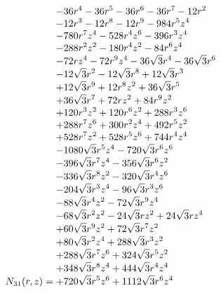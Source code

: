 \documentclass[11pt,a4paper]{article}
\begin{document}
\begin{equation}
N_{31}(r,z)=\shortstack[l]{$\displaystyle  - 36 r^{4} - 36 r^{5} - 36 r^{6} - 36 r^{7} - 12 r^{2}$\\
$\displaystyle  - 12 r^{3} - 12 r^{8} - 12 r^{9} - 984 r^{5} z^{4}$\\
$\displaystyle  - 780 r^{7} z^{4} - 528 r^{4} z^{6} - 396 r^{3} z^{4}$\\
$\displaystyle  - 288 r^{2} z^{2} - 180 r^{4} z^{2} - 84 r^{6} z^{4}$\\
$\displaystyle  - 72 r z^{4} - 72 r^{9} z^{4} - 36 \sqrt{3} r^{4} - 36 \sqrt{3} r^{6}$\\
$\displaystyle  - 12 \sqrt{3} r^{2} - 12 \sqrt{3} r^{8} + 12 \sqrt{3} r^{3}$\\
$\displaystyle  + 12 \sqrt{3} r^{9} + 12 r^{8} z^{2} + 36 \sqrt{3} r^{5}$\\
$\displaystyle  + 36 \sqrt{3} r^{7} + 72 r z^{2} + 84 r^{9} z^{2}$\\
$\displaystyle  + 120 r^{3} z^{2} + 120 r^{6} z^{2} + 288 r^{3} z^{6}$\\
$\displaystyle  + 288 r^{7} z^{6} + 300 r^{2} z^{4} + 492 r^{5} z^{2}$\\
$\displaystyle  + 528 r^{7} z^{2} + 528 r^{5} z^{6} + 744 r^{4} z^{4}$\\
$\displaystyle  - 1080 \sqrt{3} r^{5} z^{4} - 720 \sqrt{3} r^{6} z^{6}$\\
$\displaystyle  - 396 \sqrt{3} r^{7} z^{4} - 356 \sqrt{3} r^{6} z^{2}$\\
$\displaystyle  - 336 \sqrt{3} r^{8} z^{2} - 320 \sqrt{3} r^{4} z^{6}$\\
$\displaystyle  - 204 \sqrt{3} r^{3} z^{4} - 96 \sqrt{3} r^{3} z^{6}$\\
$\displaystyle  - 88 \sqrt{3} r^{4} z^{2} - 72 \sqrt{3} r^{9} z^{4}$\\
$\displaystyle  - 68 \sqrt{3} r^{2} z^{2} - 24 \sqrt{3} r z^{2} + 24 \sqrt{3} r z^{4}$\\
$\displaystyle  + 60 \sqrt{3} r^{9} z^{2} + 72 \sqrt{3} r^{7} z^{2}$\\
$\displaystyle  + 80 \sqrt{3} r^{2} z^{4} + 288 \sqrt{3} r^{3} z^{2}$\\
$\displaystyle  + 288 \sqrt{3} r^{7} z^{6} + 324 \sqrt{3} r^{5} z^{2}$\\
$\displaystyle  + 348 \sqrt{3} r^{8} z^{4} + 444 \sqrt{3} r^{4} z^{4}$\\
$\displaystyle  + 720 \sqrt{3} r^{5} z^{6} + 1112 \sqrt{3} r^{6} z^{4}$}
\label{eq:cat-numerator-31}
\end{equation}
\end{document}
